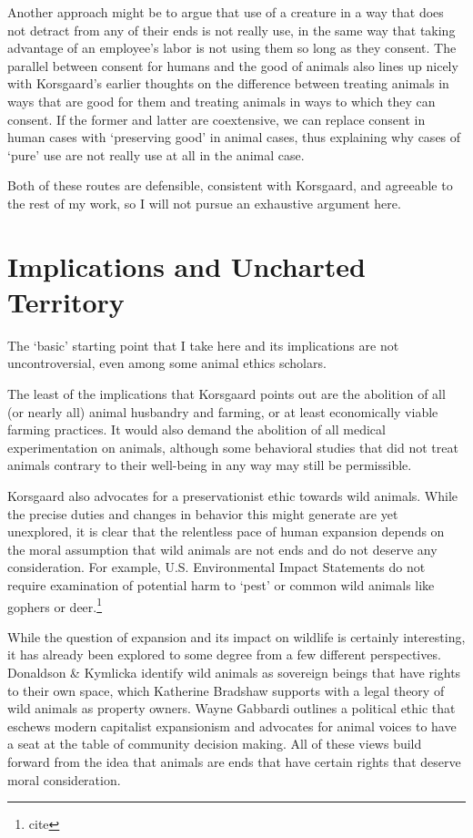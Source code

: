 		Another approach might be to argue that use of a creature in a way that
		does not detract from any of their ends is not really use, in the same
		way that taking advantage of an employee’s labor is not using them so
		long as they consent. The parallel between consent for humans and the
		good of animals also lines up nicely with Korsgaard’s earlier thoughts
		on the difference between treating animals in ways that are good for
		them and treating animals in ways to which they can consent.
		If the former and latter are coextensive, we can replace consent in
		human cases with ‘preserving good’ in animal cases, thus explaining why
		cases of ‘pure’ use are not really use at all in the animal case.

		Both of these routes are defensible, consistent with Korsgaard, and
		agreeable to the rest of my work, so I will not pursue an exhaustive
		argument here.

	\section{Implications and Uncharted Territory}
		The ‘basic’ starting point that I take here and its implications are
		not uncontroversial, even among some animal ethics scholars.

		The least of the implications that Korsgaard points out are the
		abolition of all (or nearly all) animal husbandry and farming, or at
		least economically viable farming practices. It would also demand the
		abolition of all medical experimentation on animals, although some
		behavioral studies that did not treat animals contrary to their
		well-being in any way may still be permissible.

		Korsgaard also advocates for a preservationist ethic towards wild
		animals. While the precise duties and changes in behavior this might
		generate are yet unexplored, it is clear that the relentless pace of
		human expansion depends on the moral assumption that wild animals are
		not ends and do not deserve any consideration. For example, U.S.
		Environmental Impact Statements do not require examination of potential
		harm to ‘pest’ or common wild animals like gophers or
		deer.\footnote{cite}

		While the question of expansion and its impact on wildlife is certainly
		interesting, it has already been explored to some degree from a few
		different perspectives. Donaldson \& Kymlicka identify wild animals as
		sovereign beings that have rights to their own space, which Katherine
		Bradshaw supports with a legal theory of wild animals as property
		owners. Wayne Gabbardi outlines a political ethic that eschews modern
		capitalist expansionism and advocates for animal voices to have a seat
		at the table of community decision making. All of these views build
		forward from the idea that animals are ends that have certain rights
		that deserve moral consideration.

